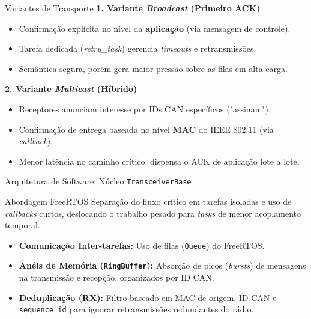 \begin{frame}{Variantes de Transporte}
    \vspace{0.2cm}
    \textbf{\large 1. Variante \textit{Broadcast} (Primeiro ACK)}
    \begin{itemize}
        \item Confirmação explícita no nível da \textbf{aplicação} (via mensagem de controle).
        \item Tarefa dedicada (\textit{retry\_task}) gerencia \textit{timeouts} e retransmissões.
        \item Semântica segura, porém gera maior pressão sobre as filas em alta carga.
    \end{itemize}
    
    \vspace{0.6cm}
    \textbf{\large 2. Variante \textit{Multicast} (Híbrido)}
    \begin{itemize}
        \item Receptores anunciam interesse por IDs CAN específicos ("assinam").
        \item Confirmação de entrega baseada no nível \textbf{MAC} do IEEE 802.11 (via \textit{callback}).
        \item Menor latência no caminho crítico: dispensa o ACK de aplicação lote a lote.
    \end{itemize}
\end{frame}

\begin{frame}{Arquitetura de Software: Núcleo \texttt{TransceiverBase}}
    \begin{block}{Abordagem FreeRTOS}
        Separação do fluxo crítico em tarefas isoladas e uso de \textit{callbacks} curtos, deslocando o trabalho pesado para \textit{tasks} de menor acoplamento temporal.
    \end{block}
    \begin{itemize}
        \item \textbf{Comunicação Inter-tarefas:} Uso de filas (\texttt{Queue}) do FreeRTOS.
        \item \textbf{Anéis de Memória (\texttt{RingBuffer}):} Absorção de picos (\textit{bursts}) de mensagens na transmissão e recepção, organizados por ID CAN.
        \item \textbf{Deduplicação (RX):} Filtro baseado em MAC de origem, ID CAN e \texttt{sequence\_id} para ignorar retransmissões redundantes do rádio.
    \end{itemize}
\end{frame}


